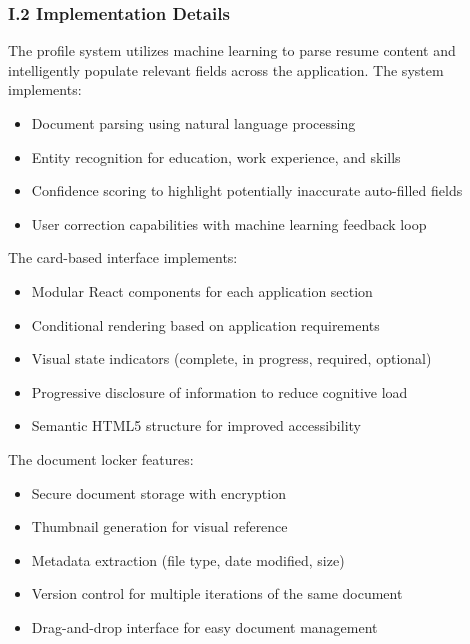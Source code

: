 \documentclass[
	letterpaper, %
]{jdf}
\begin{document}
\begin{sloppypar}
\subsubsection*{I.2 Implementation Details}

The profile system utilizes machine learning to parse resume content and intelligently populate relevant fields across the application. The system implements:

\begin{itemize}
    \item Document parsing using natural language processing
    \item Entity recognition for education, work experience, and skills
    \item Confidence scoring to highlight potentially inaccurate auto-filled fields
    \item User correction capabilities with machine learning feedback loop
\end{itemize}

The card-based interface implements:

\begin{itemize}
    \item Modular React components for each application section
    \item Conditional rendering based on application requirements
    \item Visual state indicators (complete, in progress, required, optional)
    \item Progressive disclosure of information to reduce cognitive load
    \item Semantic HTML5 structure for improved accessibility
\end{itemize}

The document locker features:

\begin{itemize}
    \item Secure document storage with encryption
    \item Thumbnail generation for visual reference
    \item Metadata extraction (file type, date modified, size)
    \item Version control for multiple iterations of the same document
    \item Drag-and-drop interface for easy document management
\end{itemize}


\end{sloppypar}
\end{document}
